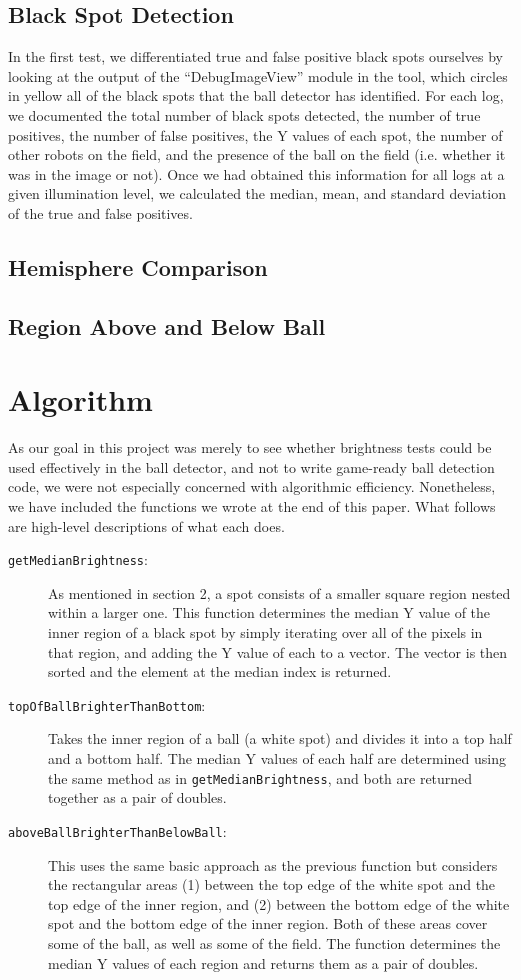 \documentclass[11pt, twocolumn]{article}
\begin{document}
\subsection{Black Spot Detection}
In the first test, we differentiated true and false positive black spots ourselves by looking at the output of the ``DebugImageView'' module in the tool, which circles in yellow all of the black spots that the ball detector has identified. For each log, we documented the total number of black spots detected, the number of true positives, the number of false positives, the Y values of each spot, the number of other robots on the field, and the presence of the ball on the field (i.e. whether it was in the image or not). Once we had obtained this information for all logs at a given illumination level, we calculated the median, mean, and standard deviation of the true and false positives.
\subsection{Hemisphere Comparison}
\subsection{Region Above and Below Ball}
\section{Algorithm}
As our goal in this project was merely to see whether brightness tests could be used effectively in the ball detector, and not to write game-ready ball detection code, we were not especially concerned with algorithmic efficiency. Nonetheless, we have included the functions we wrote at the end of this paper. What follows are high-level descriptions of what each does.
\begin{description}
\item[\texttt{getMedianBrightness}:] As mentioned in section 2, a spot consists of a smaller square region nested within a larger one. This function determines the median Y value of the inner region of a black spot by simply iterating over all of the pixels in that region, and adding the Y value of each to a vector. The vector is then sorted and the element at the median index is returned.
\item[\texttt{topOfBallBrighterThanBottom}:] Takes the inner region of a ball (a white spot) and divides it into a top half and a bottom half. The median Y values of each half are determined using the same method as in \texttt{getMedianBrightness}, and both are returned together as a pair of doubles.
\item[\texttt{aboveBallBrighterThanBelowBall}:] This uses the same basic approach as the previous function but considers the rectangular areas (1) between the top edge of the white spot and the top edge of the inner region, and (2) between the bottom edge of the white spot and the bottom edge of the inner region. Both of these areas cover some of the ball, as well as some of the field. The function determines the median Y values of each region and returns them as a pair of  doubles. 
\end{description}
\end{document}
